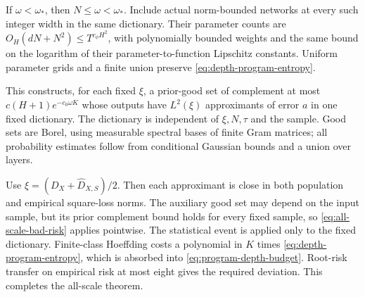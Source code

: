 If $\omega<\omega_*$, then $N\le\omega<\omega_*$. Include actual norm-bounded networks at every such integer width in the same dictionary. Their parameter counts are $O_H(dN+N^2)\le T^{c_\phi H^2}$, with polynomially bounded weights and the same bound on the logarithm of their parameter-to-function Lipschitz constants. Uniform parameter grids and a finite union preserve \eqref{eq:depth-program-entropy}.

This constructs, for each fixed $\xi$, a prior-good set of complement at most $c(H+1)e^{-c_0\omega K}$ whose outputs have $L^2(\xi)$ approximants of error $a$ in one fixed dictionary. The dictionary is independent of $\xi,N,\tau$ and the sample. Good sets are Borel, using measurable spectral bases of finite Gram matrices; all probability estimates follow from conditional Gaussian bounds and a union over layers.

Use $\xi=(D_X+\widehat D_{X,S})/2$. Then each approximant is close in both population and empirical square-loss norms. The auxiliary good set may depend on the input sample, but its prior complement bound holds for every fixed sample, so \eqref{eq:all-scale-bad-risk} applies pointwise. The statistical event is applied only to the fixed dictionary. Finite-class Hoeffding costs a polynomial in $K$ times \eqref{eq:depth-program-entropy}, which is absorbed into \eqref{eq:program-depth-budget}. Root-risk transfer on empirical risk at most eight gives the required deviation. This completes the all-scale theorem.
